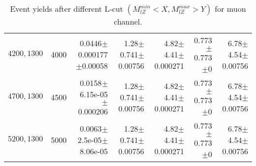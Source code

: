 \documentclass[]{article}
\begin{document}
\begin{table}
\begin{center}
{\begin{tabular}{ |r|r|r|r|r|r|r|}
$4200,1300$ & 4000 & 0.0446$\pm$0.000177$\pm$0.00058 & 1.28$\pm$0.741$\pm$0.00756 & 4.82$\pm$4.41$\pm$0.000271 & 0.773$\pm$0.773$\pm$0 & 6.78$\pm$4.54$\pm$0.00756 \\
$4700,1300$ & 4500 & 0.0158$\pm$6.15e-05$\pm$0.000206 & 1.28$\pm$0.741$\pm$0.00756 & 4.82$\pm$4.41$\pm$0.000271 & 0.773$\pm$0.773$\pm$0 & 6.78$\pm$4.54$\pm$0.00756 \\
$5200,1300$ & 5000 & 0.0063$\pm$2.5e-05$\pm$8.06e-05 & 1.28$\pm$0.741$\pm$0.00756 & 4.82$\pm$4.41$\pm$0.000271 & 0.773$\pm$0.773$\pm$0 & 6.78$\pm$4.54$\pm$0.00756 \\
\hline 
\end{tabular}
}
\end{center}
\caption{Event yields after different L-cut $(M_{lZ}^{min} < X, M_{lZ}^{max} > Y)$ for muon channel.}
\end{table}
\end{document}

